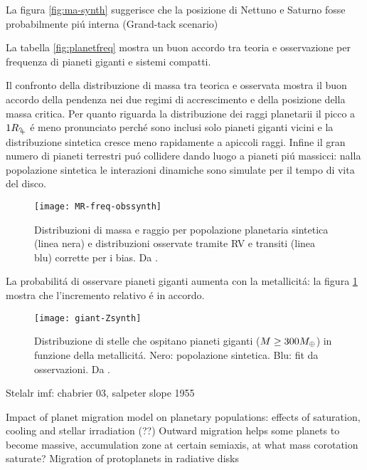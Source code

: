 La figura \ref{fig:ma-synth} suggerisce che la posizione di Nettuno e Saturno fosse probabilmente pi\'u interna (Grand-tack scenario)

La tabella \ref{fig:planetfreq} mostra un buon accordo tra teoria e osservazione per frequenza di pianeti giganti e sistemi compatti.

Il confronto della distribuzione di massa tra teorica e osservata mostra il buon accordo della pendenza nei due regimi di accrescimento e della posizione della massa critica. Per quanto riguarda la distribuzione dei raggi planetarii il picco a $1\rjupiter{}$ \'e meno pronunciato perch\'e sono inclusi solo pianeti giganti vicini e la distribuzione sintetica cresce meno rapidamente a apiccoli raggi. Infine il gran numero di pianeti terrestri pu\'o collidere dando luogo a pianeti pi\'u massicci: nalla popolazione sintetica le interazioni dinamiche sono simulate per il tempo di vita del disco.

\begin{figure}[!ht]\texttt{[image: MR-freq-obssynth]}\label{}\caption{Distribuzioni di massa e raggio per popolazione planetaria sintetica (linea nera) e distribuzioni osservate tramite RV e transiti (linea blu) corrette per i bias. Da \cite{mordasini2018planetary}.}\end{figure}

La probabilit\'a di osservare pianeti giganti aumenta con la metallicit\'a: la figura \ref{} mostra che l'incremento relativo \'e in accordo.

\begin{figure}[!ht]
\texttt{[image: giant-Zsynth]}
\caption{Distribuzione di stelle che ospitano pianeti giganti ($M\geq300M_{\oplus}{}$) in funzione della metallicit\'a. Nero: popolazione sintetica. Blu: fit da osservazioni. Da \cite{mordasini2018planetary}. }
\end{figure}

\begin{workout}

\end{workout}

\begin{workout}
Stelalr imf: chabrier 03, salpeter slope 1955
\end{workout}




\begin{workout}
Impact of planet migration model on planetary populations: effects of saturation, cooling and stellar irradiation (??)
Outward migration helps some planets to become massive, accumulation zone at certain semiaxis, at what mass corotation saturate?
Migration of protoplanets in radiative disks
\end{workout}
